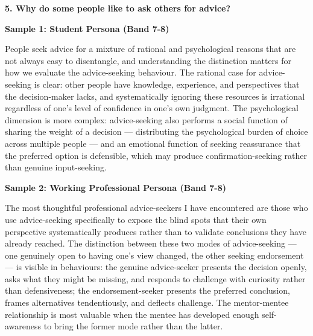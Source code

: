 \separator

\begin{ieltsquestion}
\textbf{5. Why do some people like to ask others for advice?}
\end{ieltsquestion}
\textbf{Sample 1: Student Persona (Band 7-8)}

People seek advice for a mixture of rational and psychological reasons that are not always easy to disentangle, and understanding the distinction matters for how we evaluate the advice-seeking behaviour. The rational case for advice-seeking is clear: other people have knowledge, experience, and perspectives that the decision-maker lacks, and systematically ignoring these resources is irrational regardless of one's level of confidence in one's own judgment. The psychological dimension is more complex: advice-seeking also performs a social function of sharing the weight of a decision — distributing the psychological burden of choice across multiple people — and an emotional function of seeking reassurance that the preferred option is defensible, which may produce confirmation-seeking rather than genuine input-seeking.

\textbf{Sample 2: Working Professional Persona (Band 7-8)}

The most thoughtful professional advice-seekers I have encountered are those who use advice-seeking specifically to expose the blind spots that their own perspective systematically produces rather than to validate conclusions they have already reached. The distinction between these two modes of advice-seeking — one genuinely open to having one's view changed, the other seeking endorsement — is visible in behaviours: the genuine advice-seeker presents the decision openly, asks what they might be missing, and responds to challenge with curiosity rather than defensiveness; the endorsement-seeker presents the preferred conclusion, frames alternatives tendentiously, and deflects challenge. The mentor-mentee relationship is most valuable when the mentee has developed enough self-awareness to bring the former mode rather than the latter.

\separator


